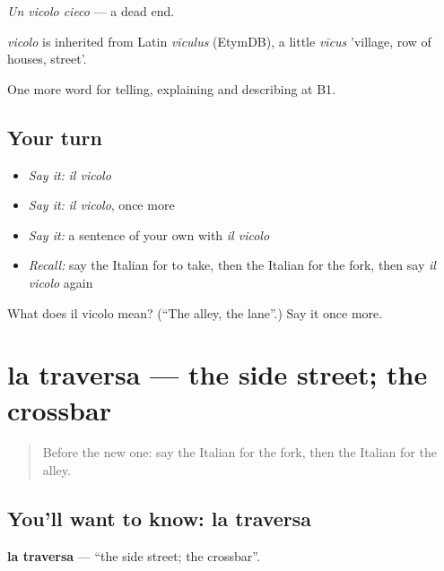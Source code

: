 \emph{Un vicolo cieco} — a dead end.

\begin{cousinweb}
\emph{vicolo} is inherited from Latin \emph{vīculus} (EtymDB), a little \emph{vīcus} 'village, row of houses, street'.
\end{cousinweb}

\begin{grammarlens}[title={What you've built}]
One more word for telling, explaining and describing at B1.
\end{grammarlens}

\subsection*{Your turn}
\begin{itemize}
\raggedright
  \item \emph{Say it:} \emph{il vicolo}
  \item \emph{Say it:} \emph{il vicolo}, once more
  \item \emph{Say it:} a sentence of your own with \emph{il vicolo}
  \item \emph{Recall:} say the Italian for to take, then the Italian for the fork, then say \emph{il vicolo} again
\end{itemize}

\begin{tcolorbox}[breakable,colback=teal!4,colframe=teal!35!black,title={Before you move on}]
What does il vicolo mean? (\textquotedblleft{}The alley, the lane\textquotedblright{}.) Say it once more.
\end{tcolorbox}
\section[la traversa]{la traversa — the side street; the crossbar}

\label{lesson:IT-C441-traversa}



\begin{quote}
Before the new one: say the Italian for the fork, then the Italian for the alley.
\end{quote}

\subsection*{You'll want to know: la traversa}
\textbf{la traversa} — \textquotedblleft{}the side street; the crossbar\textquotedblright{}.

